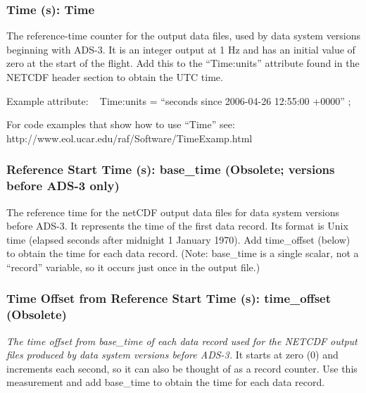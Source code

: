 \documentclass[
]{book}
\begin{document}
\hypertarget{time}{%
\subsubsection*{Time (s): Time}\label{time}}

The reference-time counter for the output data files, used by data system versions beginning with ADS-3. It is an integer output at 1 Hz and has an initial value of zero at the start of the flight. Add this to the ``Time:units'' attribute found in the NETCDF header section to obtain the UTC time.

Example attribute: ~
Time:units = ``seconds since 2006-04-26 12:55:00 +0000'' ;

For code examples that show how to use ``Time'' see:
http://www.eol.ucar.edu/raf/Software/TimeExamp.html

\hypertarget{base-time}{%
\subsubsection*{Reference Start Time (s): base\_time (Obsolete; versions before ADS-3 only)}\label{base-time}}

The reference time for the netCDF output data files for data system versions before ADS-3. It represents the time of the first data record. Its format is Unix time (elapsed seconds after midnight 1 January 1970). Add time\_offset (below) to obtain the time for each data record. (Note: base\_time is a single scalar, not a ``record'' variable, so it occurs just once in the output file.)

\hypertarget{time-offset}{%
\subsubsection*{Time Offset from Reference Start Time (s): time\_offset (Obsolete)}\label{time-offset}}

\emph{The time offset from base\_time of each data record used for the NETCDF output files produced by data system versions before ADS-3.} It starts at zero (0) and increments each second, so it can also be thought of as a record counter. Use this measurement and add base\_time to obtain the time for each data record.
\end{document}
